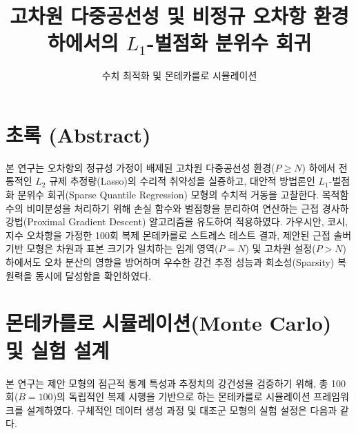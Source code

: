 \documentclass[10pt,a4paper]{article}
\begin{document}
\title{\large \textbf{고차원 다중공선성 및 비정규 오차항 환경 하에서의 $L_1$-벌점화 분위수 회귀}}
\author{\small 수치 최적화 및 몬테카를로 시뮬레이션}
\date{}
\maketitle

\section{초록 (Abstract)}
본 연구는 오차항의 정규성 가정이 배제된 고차원 다중공선성 환경($P \ge N$) 하에서 전통적인 $L_2$ 규제 추정량(Lasso)의 수리적 취약성을 실증하고, 대안적 방법론인 $L_1$-벌점화 분위수 회귀(Sparse Quantile Regression) 모형의 수치적 거동을 고찰한다. 목적함수의 비미분성을 처리하기 위해 손실 함수와 벌점항을 분리하여 연산하는 근접 경사하강법(Proximal Gradient Descent) 알고리즘을 유도하여 적용하였다. 가우시안, 코시, 지수 오차항을 가정한 100회 복제 몬테카를로 스트레스 테스트 결과, 제안된 근접 솔버 기반 모형은 차원과 표본 크기가 일치하는 임계 영역($P=N$) 및 고차원 설정($P>N$) 하에서도 오차 분산의 영향을 방어하며 우수한 강건 추정 성능과 희소성(Sparsity) 복원력을 동시에 달성함을 확인하였다.

\section{몬테카를로 시뮬레이션(Monte Carlo) 및 실험 설계}
본 연구는 제안 모형의 점근적 통계 특성과 추정치의 강건성을 검증하기 위해, 총 100회($B=100$)의 독립적인 복제 시행을 기반으로 하는 몬테카를로 시뮬레이션 프레임워크를 설계하였다. 구체적인 데이터 생성 과정 및 대조군 모형의 실험 설정은 다음과 같다.
\end{document}
